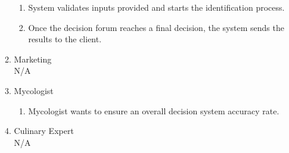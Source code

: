 \documentclass{article}
\begin{document}
\begin{enumerate}[{\bf BE1.}]
\begin{enumerate}[{\bf VP1.}]
\begin{enumerate}[1.]
					\item System validates inputs provided and starts the identification process.
					\item Once the decision forum reaches a final decision, the system sends the results to the client.
				\end{enumerate}
			\item Marketing\\
				N/A
			\item Mycologist\\
				\begin{enumerate}[1.]
					\item Mycologist wants to ensure an overall decision system accuracy rate.
				\end{enumerate}
			\item Culinary Expert\\
				N/A
		\end{enumerate}
		

\end{enumerate}
\end{document}

